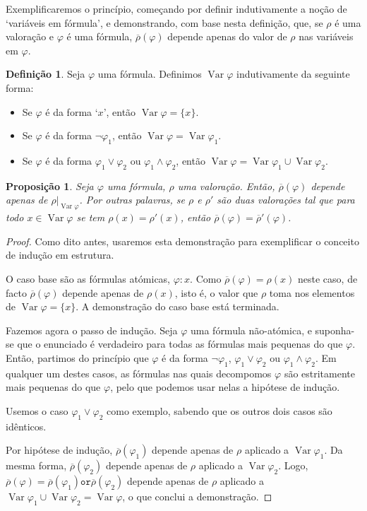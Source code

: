 \documentclass{report}
\newtheorem*{prop*}{Proposição}
\theoremstyle{definition}
\newtheorem*{definicao*}{Definição}
\theoremstyle{remark}
\DeclareMathOperator{\var}{Var}
\newcommand{\por}{\mathbin{\texttt{or}}}
\begin{document}
	Exemplificaremos o princípio, começando por definir indutivamente a noção de `variáveis em fórmula', e demonstrando, com base nesta definição, que, se $\rho$ é uma valoração e $\varphi$ é uma fórmula, $\overline\rho(\varphi)$ depende apenas do valor de $\rho$ nas variáveis em $\varphi$.
	
	\begin{definicao*}
	Seja $\varphi$ uma fórmula. Definimos $\var \varphi$ indutivamente da seguinte forma:
	\begin{itemize}
	\item Se $\varphi$ é da forma `$x$', então $\var \varphi = \{x\}$.
	
	\item Se $\varphi$ é da forma $\neg \varphi_1$, então $\var \varphi = \var \varphi_1$.
	
	\item Se $\varphi$ é da forma $\varphi_1 \lor \varphi_2$ ou $\varphi_1 \land \varphi_2$, então $\var \varphi = \var \varphi_1 \cup \var \varphi_2$.
	\end{itemize}
	\end{definicao*}
	
	\begin{prop*}
	Seja $\varphi$ uma fórmula, $\rho$ uma valoração. Então, $\overline \rho(\varphi)$ depende apenas de $\rho|_{\var \varphi}$. Por outras palavras, se $\rho$ e $\rho'$ são duas valorações tal que para todo $x \in \var \varphi$ se tem $\rho(x) = \rho'(x)$, então $\overline \rho(\varphi) = \overline \rho'(\varphi)$.
	\end{prop*}
	
	\begin{proof}
	Como dito antes, usaremos esta demonstração para exemplificar o conceito de indução em estrutura.
	
	O caso base são as fórmulas atómicas, $\varphi : x$. Como $\overline\rho(\varphi) = \rho(x)$ neste caso, de facto $\overline\rho(\varphi)$ depende apenas de $\rho(x)$, isto é, o valor que $\rho$ toma nos elementos de $\var \varphi = \{x\}$. A demonstração do caso base está terminada.
	
	Fazemos agora o passo de indução. Seja $\varphi$ uma fórmula não-atómica, e suponha-se que o enunciado é verdadeiro para todas as fórmulas mais pequenas do que $\varphi$. Então, partimos do princípio que $\varphi$ é da forma $\neg \varphi_1$, $\varphi_1 \lor \varphi_2$ ou $\varphi_1 \land \varphi_2$. Em qualquer um destes casos, as fórmulas nas quais decompomos $\varphi$ são estritamente mais pequenas do que $\varphi$, pelo que podemos usar nelas a hipótese de indução.
	
	Usemos o caso $\varphi_1 \lor \varphi_2$ como exemplo, sabendo que os outros dois casos são idênticos.
	
	Por hipótese de indução, $\overline\rho(\varphi_1)$ depende apenas de $\rho$ aplicado a $\var \varphi_1$. Da mesma forma, $\overline\rho(\varphi_2)$ depende apenas de $\rho$ aplicado a $\var \varphi_2$. Logo, $\overline\rho(\varphi) = \overline\rho(\varphi_1) \por \overline\rho(\varphi_2)$ depende apenas de $\rho$ aplicado a $\var \varphi_1 \cup \var \varphi_2 = \var \varphi$, o que conclui a demonstração.
	\end{proof}
	
\end{document}
